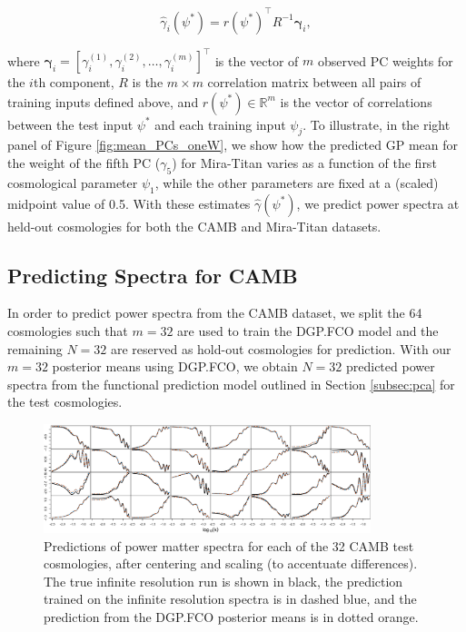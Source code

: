 \documentclass[11pt]{article}
\begin{document}
\begin{equation*}
\hat{\gamma}_i(\psi^*) = r(\psi^*)^\top R^{-1} \boldsymbol{\gamma}_i,
\end{equation*}

where $\boldsymbol{\gamma}_i = [\gamma_i^{(1)}, \gamma_i^{(2)}, \ldots, \gamma_i^{(m)}]^\top$ is the vector of 
$m$ observed PC weights for the $i$th component, $R$ is the $m \times m$ correlation matrix between 
all pairs of training inputs defined above, and $r(\psi^*) \in \mathbb{R}^m$ is the vector of correlations between 
the test input $\psi^*$ and each training input $\psi_j$. To illustrate, in the right panel of Figure \ref{fig:mean_PCs_oneW}, 
we show how the predicted GP mean for the weight of the fifth PC ($\gamma_5$) for Mira-Titan 
varies as a function of the first cosmological parameter $\psi_1$, while the other parameters are fixed at a (scaled)
midpoint value of 0.5. With these estimates $\hat{\gamma}(\psi^*)$, we predict power spectra at 
held-out cosmologies for both the CAMB and Mira-Titan datasets.

\subsection{Predicting Spectra for CAMB}
\label{subsec:camb_pred}

In order to predict power spectra from the CAMB dataset, we split the 64 cosmologies such that $m=32$
are used to train the DGP.FCO model and the remaining $N=32$ are reserved as hold-out cosmologies for
prediction. With our $m=32$ posterior means using DGP.FCO, we obtain $N=32$ predicted power spectra from
the functional prediction model outlined in Section \ref{subsec:pca} for the test cosmologies.

\begin{figure}
    \centering
    \includegraphics[width=0.85\textwidth]{pred_diffs_CAMB.jpeg}
    \caption{Predictions of power matter spectra for each of the 32 CAMB test cosmologies,
             after centering and scaling (to accentuate differences). 
             The true infinite resolution run is shown in black, the prediction 
             trained on the infinite resolution spectra is in dashed blue, and the prediction from 
             the DGP.FCO posterior means is in dotted orange.}
    \label{fig:pca_preds_v_camb}
\end{figure}
\end{document}
